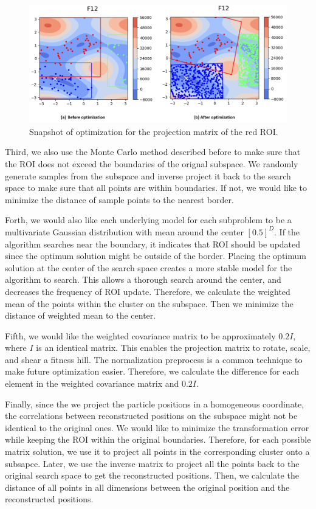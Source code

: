 \begin{figure}
\centering
\includegraphics[width=\textwidth]{Sample_projection}
\caption{Snapshot of optimization for the projection matrix of the red ROI.}\label{fig:Sample_projection}
\end{figure}

Third, we also use the Monte Carlo method described before to make sure that the ROI does not exceed the boundaries of the orignal subspace.
We randomly generate samples from the subspace and inverse project it back to the search space to make sure that all points are within boundaries.
If not, we would like to minimize the distance of sample points to the nearest border.

Forth, we would also like each underlying model for each subproblem 
to be a multivariate Gaussian distribution with mean around the center $[0.5]^D$.
If the algorithm searches near the boundary, it indicates that ROI should be updated since the optimum solution might be outside of the border.
Placing the optimum solution at the center of the search space creates a more stable model for the algorithm to search.
This allows a thorough search around the center, and decreases the frequency of ROI update.
Therefore, we calculate the weighted mean of the points within the cluster on the subspace.
Then we minimize the distance of weighted mean to the center.  

Fifth, we would like the weighted covariance matrix to be approximately $0.2I$, where $I$ is an identical matrix.
This enables the projection matrix to rotate, scale, and shear a fitness hill.
The normalization preprocess is a common technique to make future optimization easier.
Therefore, we calculate the difference for each element in the weighted covariance matrix and $0.2I$.  

Finally, since the we project the particle positions in a homogeneous coordinate,
the correlations between reconstructed positions on the subspace might not be identical to the original ones.
We would like to minimize the transformation error while keeping the ROI within the original boundaries.
Therefore, for each possible matrix solution, we use it to project all points in the corresponding cluster onto a subsapce.
Later, we use the inverse matrix to project all the points back to the original search space to get the reconstructed positions.
Then, we calculate the distance of all points in all dimensions between the original position and the reconstructed positions.


